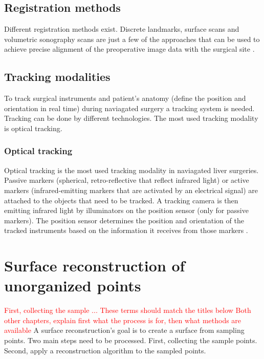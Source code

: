 \subsection{Registration methods}
Different registration methods exist. Discrete landmarks, surface scans and
volumetric sonography scans are just a few of the approaches that can be
used to achieve precise alignment of the preoperative image data with the
surgical site \cite{banz2016intraoperative}.

\subsection{Tracking modalities}
To track surgical instruments and patient's anatomy (define the position and
orientation in real time) during naviagated surgery a tracking system is needed.
Tracking can be done by different technologies. The most used tracking
modality is optical tracking. 

\subsubsection{Optical tracking}
Optical tracking is the most used tracking modality in naviagated liver
surgeries. Passive markers (spherical, retro-reflective that reflect infrared
light) or active markers (infrared-emitting markers that are activated by an
electrical signal) \cite{wiles2004accuracy} are attached to the objects that
need to be tracked. A tracking camera is then emitting infrared light by illuminators
on the position sensor (only for passive markers). The position sensor
determines the position and orientation of the tracked instruments based on the
information it receives from those markers \cite{noauthor_polaris_nodate}.  

\section{Surface reconstruction of unorganized points}
\textcolor{red}{First, collecting the sample ... These terms should match the titles below
Both other chapters, explain first what the process is for, then what methods are available}
A surface reconstruction's goal is to create a surface from sampling points. Two
main steps need to be processed. First, collecting the sample points. Second,
apply a reconstruction algorithm to the sampled points.
